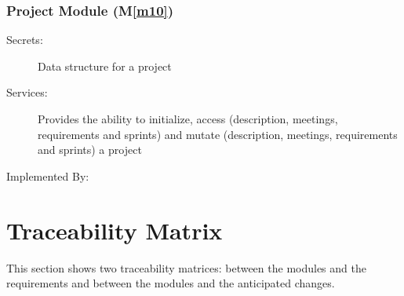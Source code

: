 \documentclass[12pt, titlepage]{article}
\newcommand{\mref}[1]{M\ref{#1}}
\begin{document}
\subsubsection{Project Module (\mref{m10})}
\begin{description}
    \item[Secrets:] Data structure for a project
    \item[Services:] Provides the ability to initialize, access (description, meetings, requirements and sprints) and mutate (description, meetings, requirements and sprints) a project
    \item[Implemented By:]
\end{description}


\section{Traceability Matrix} \label{SecTM}

This section shows two traceability matrices: between the modules and the
requirements and between the modules and the anticipated changes.
\end{document}
